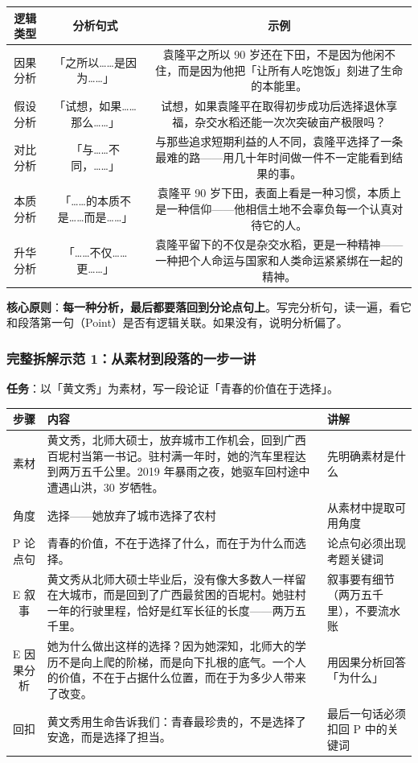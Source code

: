 \begin{center}
\begin{tabular}{c|c|c}
\textbf{逻辑类型} & \textbf{分析句式} & \textbf{示例} \\ \hline
因果分析 & 「之所以……是因为……」 & 袁隆平之所以 90 岁还在下田，不是因为他闲不住，而是因为他把「让所有人吃饱饭」刻进了生命的本能里。 \\
假设分析 & 「试想，如果……那么……」 & 试想，如果袁隆平在取得初步成功后选择退休享福，杂交水稻还能一次次突破亩产极限吗？ \\
对比分析 & 「与……不同，……」 & 与那些追求短期利益的人不同，袁隆平选择了一条最难的路——用几十年时间做一件不一定能看到结果的事。 \\
本质分析 & 「……的本质不是……而是……」 & 袁隆平 90 岁下田，表面上看是一种习惯，本质上是一种信仰——他相信土地不会辜负每一个认真对待它的人。 \\
升华分析 & 「……不仅……更……」 & 袁隆平留下的不仅是杂交水稻，更是一种精神——一种把个人命运与国家和人类命运紧紧绑在一起的精神。 \\
\end{tabular}
\end{center}

\textbf{核心原则}：\textbf{每一种分析，最后都要落回到分论点句上}。写完分析句，读一遍，看它和段落第一句（Point）是否有逻辑关联。如果没有，说明分析偏了。

\subsubsection{完整拆解示范 1：从素材到段落的一步一讲}

\textbf{任务}：以「黄文秀」为素材，写一段论证「青春的价值在于选择」。

\begin{center}
\begin{tabular}{c|l|l}
\textbf{步骤} & \textbf{内容} & \textbf{讲解} \\ \hline
素材 & 黄文秀，北师大硕士，放弃城市工作机会，回到广西百坭村当第一书记。驻村满一年时，她的汽车里程达到两万五千公里。2019 年暴雨之夜，她驱车回村途中遭遇山洪，30 岁牺牲。 & 先明确素材是什么 \\
角度 & 选择——她放弃了城市选择了农村 & 从素材中提取可用角度 \\
P 论点句 & 青春的价值，不在于选择了什么，而在于为什么而选择。 & 论点句必须出现考题关键词 \\
E 叙事 & 黄文秀从北师大硕士毕业后，没有像大多数人一样留在大城市，而是回到了广西最贫困的百坭村。她驻村一年的行驶里程，恰好是红军长征的长度——两万五千里。 & 叙事要有细节（两万五千里），不要流水账 \\
E 因果分析 & 她为什么做出这样的选择？因为她深知，北师大的学历不是向上爬的阶梯，而是向下扎根的底气。一个人的价值，不在于占据什么位置，而在于为多少人带来了改变。 & 用因果分析回答「为什么」\\
回扣 & 黄文秀用生命告诉我们：青春最珍贵的，不是选择了安逸，而是选择了担当。 & 最后一句话必须扣回 P 中的关键词 \\
\end{tabular}
\end{center}

